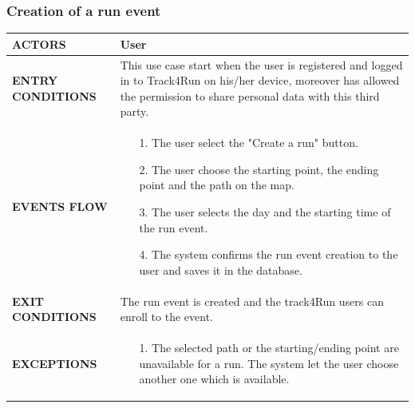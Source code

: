 \documentclass[a4paper]{article}
\begin{document}
\vspace{1cm}

\subsubsection{Creation of a run event}
\begin{center}
    \begin{tabular}{l || p{8cm} ||}
        \bf{ACTORS} & User \\ \hline
        \bf{ENTRY CONDITIONS} & This use case start when the user is registered and logged in to Track4Run on his/her device, moreover has allowed the permission to share personal data with this third party.  \\ \hline
        \bf{EVENTS FLOW} & \begin{itemize}[noitemsep, topsep=0cm, leftmargin=*] \vspace{-0.2cm}
            \item[1.] The user select the "Create a run" button.
            \item[2.] The user choose the starting point, the ending point and the path on the map.
            \item[3.] The user selects the day and the starting time of the run event.
            \item[4.] The system confirms the run event creation to the user and saves it in the database.
        \end{itemize}
        \\ \hline
        \bf{EXIT CONDITIONS} & The run event is created and the track4Run users can enroll to the event.\\ \hline
        \bf{EXCEPTIONS} & \begin{itemize}[noitemsep, topsep=0cm, leftmargin=*] \vspace{-0.2cm}
            \item[1.] The selected path or the starting/ending point are unavailable for a run. The system let the user choose another one which is available.
        \end{itemize}
        \\ \hline \hline
    \end{tabular}
\end{center}

\vspace{1cm}
\end{document}
